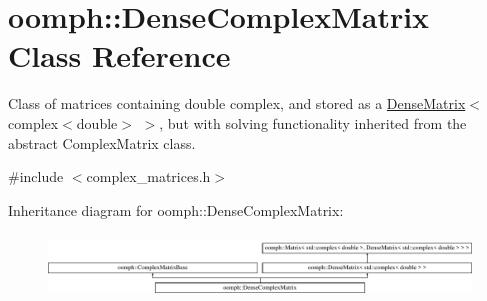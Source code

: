 \hypertarget{classoomph_1_1DenseComplexMatrix}{}\section{oomph\+:\+:Dense\+Complex\+Matrix Class Reference}
\label{classoomph_1_1DenseComplexMatrix}


Class of matrices containing double complex, and stored as a \hyperlink{classoomph_1_1DenseMatrix}{Dense\+Matrix}$<$complex$<$double$>$ $>$, but with solving functionality inherited from the abstract Complex\+Matrix class.  




{\ttfamily \#include $<$complex\+\_\+matrices.\+h$>$}

Inheritance diagram for oomph\+:\+:Dense\+Complex\+Matrix\+:\begin{figure}[H]
\begin{center}
\leavevmode
\includegraphics[height=1.728395cm]{classoomph_1_1DenseComplexMatrix}
\end{center}
\end{figure}
